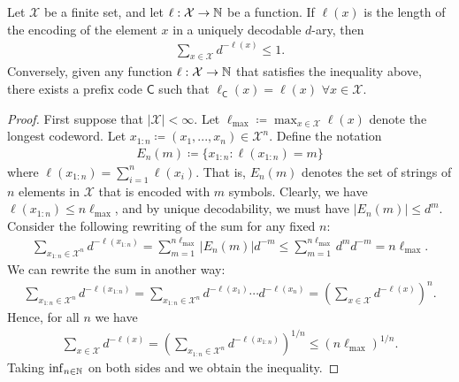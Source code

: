 \documentclass[a4paper]{article}
\begin{document}
\begin{theorem}\label{thm:kraft-mcmillan-inequality}
	Let $\mathcal{X}$ be a finite set,
	and let $\ell:\mathcal{X}\to\mathbb{N}$ be a function.
	If $\ell(x)$ is the length of the encoding of the element $x$ in a uniquely decodable $d$-ary,
	then
	\begin{align*}
		\sum_{x\in\mathcal{X}} d^{-\ell(x)} \leq 1.
	\end{align*}
	Conversely, given any function $\ell:\mathcal{X}\to\mathbb{N}$
	that satisfies the inequality above,
	there exists a prefix code $\mathsf{C}$ such that $\ell_{\mathsf{C}}(x)=\ell(x)$ $\forall x\in\mathcal{X}$.
\end{theorem}
\begin{proof}
	First suppose that $|\mathcal{X}|<\infty$.
	Let $\ell_{\text{max}}\coloneqq\max_{x\in\mathcal{X}}\ell(x)$ denote the longest codeword.
	Let $x_{1:n}\coloneqq(x_1,...,x_n)\in\mathcal{X}^n$.
	Define the notation
	\begin{align*}
		E_n(m) \coloneqq \{x_{1:n}:\ell(x_{1:n})=m\}
	\end{align*}
	where $\ell(x_{1:n})=\sum_{i=1}^n\ell(x_i)$.
	That is, $E_n(m)$ denotes the set of strings of $n$ elements in $\mathcal{X}$ that is encoded with $m$ symbols.
	Clearly, we have $\ell(x_{1:n})\leq n\ell_{\text{max}}$,
	and by unique decodability, we must have $|E_n(m)|\leq d^m$.
	Consider the following rewriting of the sum for any fixed $n$:
	\begin{align*}
		\sum_{x_{1:n}\in\mathcal{X}^n} d^{-\ell(x_{1:n})}
		= \sum_{m=1}^{n\ell_{\text{max}}} |E_n(m)| d^{-m}
		\leq \sum_{m=1}^{n\ell_{\text{max}}} d^{m} d^{-m}
		= n\ell_{\text{max}}.
	\end{align*}
	We can rewrite the sum in another way:
	\begin{align*}
		\sum_{x_{1:n}\in\mathcal{X}^n} d^{-\ell(x_{1:n})}
		= \sum_{x_{1:n}\in\mathcal{X}^n} d^{-\ell(x_1)} \cdots d^{-\ell(x_n)}
		= \left( \sum_{x\in\mathcal{X}} d^{-\ell(x)} \right)^{n}.
	\end{align*}
	Hence, for all $n$ we have
	\begin{align*}
		\sum_{x\in\mathcal{X}} d^{-\ell(x)}
		= \left( \sum_{x_{1:n}\in\mathcal{X}^n} d^{-\ell(x_{1:n})} \right)^{1/n}
		\leq (n\ell_{\text{max}})^{1/n}.
	\end{align*}
	Taking $\inf_{n\in\mathbb{N}}$ on both sides and we obtain the inequality.


\end{proof}
\end{document}
